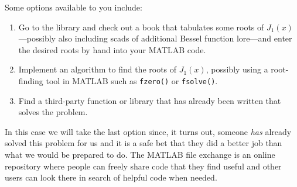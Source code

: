 \noindent Some options available to you include:
\begin{enumerate}
\item Go to the library and check out a book that tabulates some roots of $J_{1}(x)$---possibly also including scads of additional Bessel function lore\cite{bowman2012introduction}---and enter the desired roots by hand into your MATLAB code.
\item Implement an algorithm to find the roots of $J_1(x)$, possibly using a root-finding tool in MATLAB such as \lstinline[style=myMatlab]{fzero()} or \lstinline[style=myMatlab]{fsolve()}.
\item Find a third-party function or library that has already been written that solves the problem.
\end{enumerate}
In this case we will take the last option since, it turns out, someone \emph{has} already solved this problem for us and it is a safe bet that they did a better job than what we would be prepared to do.  The MATLAB file exchange is an online repository where people can freely share code that they find useful and other users can look there in search of helpful code when needed. 

